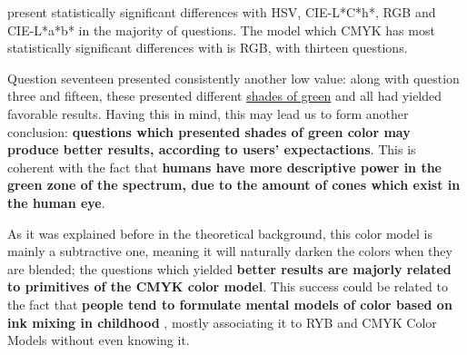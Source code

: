 present statistically significant differences with HSV, CIE-L*C*h*, RGB and CIE-L*a*b* in the majority of questions. The model which CMYK has most statistically significant differences with is RGB, with thirteen questions. \par
%
Question seventeen presented consistently another low value: along with question three and fifteen, these presented different \ul{shades of green} and all had yielded favorable results. Having this in mind, this may lead us to
form another conclusion: \textbf{questions which presented shades of green color may produce better results, according to users' expectactions}. This is coherent with the fact that \textbf{humans have more descriptive power
in the green zone of the spectrum, due to the amount of cones which exist in the human eye}. \par
%
As it was explained before in the theoretical background, this color model is mainly a subtractive one, meaning it will naturally darken the colors when they are blended; the questions which yielded \textbf{better results are majorly
related to primitives of the CMYK color model}. This success could be related to the fact that \textbf{people tend to formulate mental models of color based on ink mixing in childhood} \cite{Gossett2004}, mostly associating it to
\gls{RYB} and CMYK Color Models without even knowing it. \par
%
